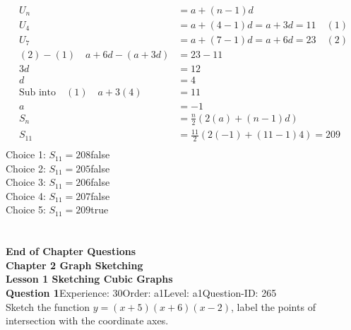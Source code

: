 \documentclass{article}
\begin{document}
\\[-35pt]\begin{align*}
U_n&=a+(n-1)d\\[2pt]
U_4&=a+(4-1)d=a+3d=11\quad (1)\\[2pt]
U_7&=a+(7-1)d=a+6d=23\quad (2)\\[2pt]
(2)-(1)\quad a+6d-(a+3d)&=23-11\\[2pt]
3d&=12\\[2pt]
d&=4\\[2pt]
\text{Sub into} \quad (1) \quad a+3(4)&=11\\[2pt]
a&=-1\\[12pt]
S_n&=\displaystyle\frac{n}{2}(2(a)+(n-1)d)\\[2pt]
S_{11}&=\displaystyle\frac{11}{2}(2(-1)+(11-1)4)=209\\
\end{align*}
Choice 1: \hspace{20pt}$S_{11}=208$\hspace{20pt}false\\
Choice 2: \hspace{20pt}$S_{11}=205$\hspace{20pt}false\\
Choice 3: \hspace{20pt}$S_{11}=206$\hspace{20pt}false\\
Choice 4: \hspace{20pt}$S_{11}=207$\hspace{20pt}false\\
Choice 5: \hspace{20pt}$S_{11}=209$\hspace{20pt}true\\
\\[4pt]
\\[2pt]
\noindent\large{\textbf{End of Chapter Questions}}\\[15pt]
\noindent\huge{\textbf{Chapter 2 Graph Sketching}}\\[15pt]
\noindent\huge{\textbf{Lesson 1 Sketching Cubic Graphs}}\\[12pt]
\noindent\textbf{Question 1}\hspace{20pt}Experience: 30\hspace{20pt}Order: a1\hspace{20pt}Level: a1\hspace{20pt}Question-ID: 265\\[2pt]
Sketch the function $y=(x+5)(x+6)(x-2)$, label the points of intersection with the coordinate axes.\\[4pt]
\end{document}
